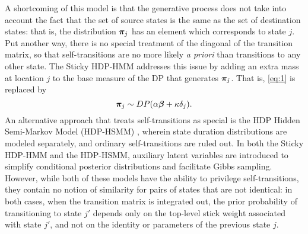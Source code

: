 A shortcoming of this model is that the generative process does not
take into account the fact that the set of source states is the same
as the set of destination states: that is, the distribution $\boldsymbol{\pi}_j$
has an element which corresponds to state $j$.  Put another way, there
is no special treatment of the diagonal of the transition matrix, so
that self-transitions are no more likely {\it a priori} than
transitions to any other state.  The Sticky HDP-HMM \cite{fox2008hdp}
addresses this issue by adding an extra mass at location $j$ to the base
measure of the DP that generates $\boldsymbol{\pi}_j$.  That is, \eqref{eq:1} is replaced by
\begin{equation}
  \label{eq:6}
  \boldsymbol{\pi}_j \sim DP(\alpha\boldsymbol{\beta} + \kappa \delta_j).
\end{equation}
An alternative approach that treats self-transitions as special 
is the HDP Hidden Semi-Markov Model (HDP-HSMM)
\cite{johnson2013bayesian}, wherein state duration distributions are modeled
separately, and ordinary self-transitions are ruled out.  In both the
Sticky HDP-HMM and the HDP-HSMM, auxiliary latent variables are introduced to simplify
conditional posterior distributions and facilitate Gibbs sampling.
However, while both of these models have the ability to privilege
self-transitions, they contain no notion of
similarity for pairs of states that are not identical: 
in both cases, when the transition matrix
is integrated out, the prior probability of
transitioning to state $j'$ depends only on the top-level stick
weight associated with state $j'$, and not on the identity or
parameters of the previous state $j$.
